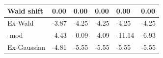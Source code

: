 \begin{tabular}{|l|l|l|l|l|l|}
\hline
Wald shift&0.00&0.00&0.00&0.00&0.00\\\hline
Ex-Wald&-3.87&-4.25&-4.25&-4.25&-4.25\\\hline
\rocdd{}-mod&-4.43&-0.09&-4.09&-11.14&-6.93\\\hline
Ex-Gaussian&-4.81&-5.55&-5.55&-5.55&-5.55\\\hline
\end{tabular}
